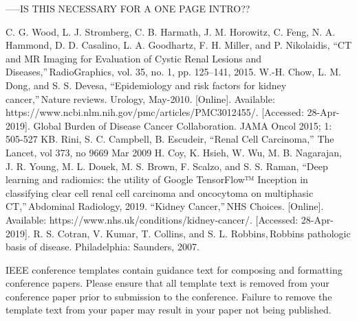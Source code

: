\documentclass[conference]{IEEEtran}
\begin{document}
-----IS THIS NECESSARY FOR A ONE PAGE INTRO?? 
%
%
\begin{thebibliography}{00}
 C. G. Wood, L. J. Stromberg, C. B. Harmath, J. M. Horowitz, C. Feng, N. A. Hammond, D. D. Casalino, L. A. Goodhartz, F. H. Miller, and P. Nikolaidis, “CT and MR Imaging for Evaluation of Cystic Renal Lesions and Diseases,” RadioGraphics, vol. 35, no. 1, pp. 125–141, 2015. 
 W.-H. Chow, L. M. Dong, and S. S. Devesa, “Epidemiology and risk factors for kidney cancer,” Nature reviews. Urology, May-2010. [Online]. Available: https://www.ncbi.nlm.nih.gov/pmc/articles/PMC3012455/. [Accessed: 28-Apr-2019]. 
 Global Burden of Disease Cancer Collaboration. JAMA Oncol 2015; 1: 505-527 
 KB. Rini, S. C. Campbell, B. Escudeir, “Renal Cell Carcinoma,” The Lancet, vol 373, no 9669 Mar 2009 
 H. Coy, K. Hsieh, W. Wu, M. B. Nagarajan, J. R. Young, M. L. Douek, M. S. Brown, F. Scalzo, and S. S. Raman, “Deep learning and radiomics: the utility of Google TensorFlow™ Inception in classifying clear cell renal cell carcinoma and oncocytoma on multiphasic CT,” Abdominal Radiology, 2019. 
 “Kidney Cancer,” NHS Choices. [Online]. Available: https://www.nhs.uk/conditions/kidney-cancer/. [Accessed: 28-Apr-2019]. 
 R. S. Cotran, V. Kumar, T. Collins, and S. L. Robbins, Robbins pathologic basis of disease. Philadelphia: Saunders, 2007. 
\end{thebibliography}
\vspace{12pt}
\color{red}
IEEE conference templates contain guidance text for composing and formatting conference papers. Please ensure that all template text is removed from your conference paper prior to submission to the conference. Failure to remove the template text from your paper may result in your paper not being published.
\end{document}
